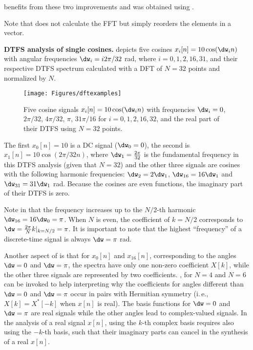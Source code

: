  benefits from these two improvements and was obtained using .


Note that  does not calculate the FFT but simply reorders the elements in a vector.
\eApplication


\bApplication \textbf{DTFS analysis of single cosines.}
 depicts five cosines $x_i[n]=10 \cos(\dw_i n)$ with angular frequencies $\dw_i = i 2 \pi/32$ rad, where $i=0,1,2,16,31$, and their respective DTFS spectrum calculated with a DFT of $N=32$ points and normalized by $N$. 

\begin{figure}[!htb]
        \centering
                \texttt{[image: Figures/dftexamples]}         
        \caption{Five cosine signals $x_i[n]=10 \cos(\dw_i n)$ with frequencies $\dw_i = 0$, $2 \pi / 32$, $4 \pi /32$, $\pi$, $31 \pi /16$ for $i=0,1,2,16,32$, and the real part of their DTFS using $N=32$ points. \label{fig:dftexamples}}
\end{figure}

The first $x_0[n]=10$ is a DC signal ($\dw_0=0$), the second is $x_1[n]=10 \cos(2\pi/32 n)$, where $\dw_1 = \frac{2 \pi}{32}$ is the fundamental frequency in this DTFS analysis (given that $N=32$) and the other three signals are cosines with the following harmonic frequencies: $\dw_2=2 \dw_1$, $\dw_{16}=16 \dw_1$ and $\dw_{31}=31 \dw_1$ rad. Because the cosines are even functions, the imaginary part of their DTFS is zero.

Note in  that the frequency increases up to the $N/2$-th harmonic $\dw_{16}=16 \dw_0=\pi$.
When $N$ is even, the coefficient of $k=N/2$ corresponds to $\dw = \frac{2 \pi}{N} k |_{k=N/2}= \pi$.
It is important to note that the highest ``frequency'' of a discrete-time signal is always $\dw = \pi$ rad. 

Another aspect of  is that for $x_0[n]$ and $x_{16}[n]$, corresponding to the angles $\dw=0$ and $\dw=\pi$, the spectra have only one non-zero coefficient $X[k]$, while the other three signals are represented by two coefficients. , for $N=4$ and $N=6$ can be invoked to help interpreting why the coefficients for angles different than $\dw=0$ and $\dw=\pi$ occur in pairs with Hermitian symmetry (i.\,e., $X[k]=X^*[-k]$ when $x[n]$ is real). The basis functions for $\dw=0$ and $\dw=\pi$ are real signals while the other angles lead to complex-valued signals. In the analysis of a real signal $x[n]$, using the $k$-th complex basis requires also using the $-k$-th basis, such that their imaginary parts can cancel in the synthesis of a real $x[n]$.
\eApplication

